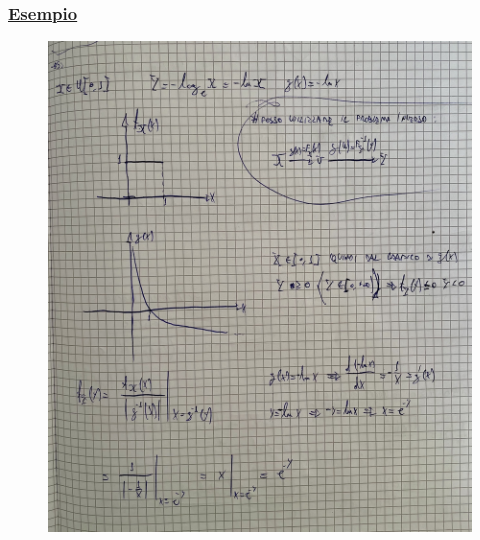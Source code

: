 \documentclass{article}
\begin{document}
\subsubsection{\underline{Esempio}}
\begin{figure}[H]
\centering
\includegraphics[scale=0.16]{ese/26.jpeg}
\end{figure}
\end{document}
